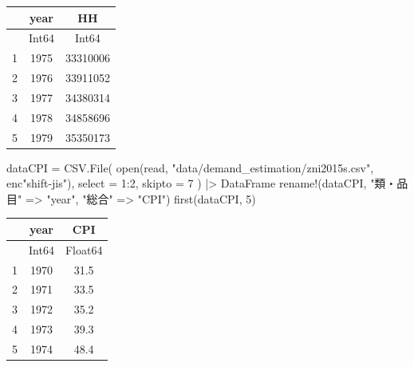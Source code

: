 \documentclass[
  letterpaper,
  DIV=11,
  numbers=noendperiod]{scrreprt}
\newenvironment{Shaded}{\begin{snugshade}}{\end{snugshade}}
\newcommand{\FloatTok}[1]{\textcolor[rgb]{0.68,0.00,0.00}{#1}}
\newcommand{\FunctionTok}[1]{\textcolor[rgb]{0.28,0.35,0.67}{#1}}
\newcommand{\NormalTok}[1]{\textcolor[rgb]{0.00,0.23,0.31}{#1}}
\newcommand{\OperatorTok}[1]{\textcolor[rgb]{0.37,0.37,0.37}{#1}}
\newcommand{\StringTok}[1]{\textcolor[rgb]{0.13,0.47,0.30}{#1}}
\begin{document}
\begin{tabular}{r|cc}
    & year & HH\\
    \hline
    & Int64 & Int64\\
    \hline
    1 & 1975 & 33310006 \\
    2 & 1976 & 33911052 \\
    3 & 1977 & 34380314 \\
    4 & 1978 & 34858696 \\
    5 & 1979 & 35350173 \\
\end{tabular}

\begin{Shaded}
\begin{Highlighting}[]
\NormalTok{dataCPI }\OperatorTok{=}\NormalTok{ CSV.}\FunctionTok{File}\NormalTok{(}
    \FunctionTok{open}\NormalTok{(read, }\StringTok{"data/demand\_estimation/zni2015s.csv"}\NormalTok{, enc}\StringTok{"shift{-}jis"}\NormalTok{), }
\NormalTok{    select }\OperatorTok{=} \FloatTok{1}\OperatorTok{:}\FloatTok{2}\NormalTok{,}
\NormalTok{    skipto }\OperatorTok{=} \FloatTok{7}
\NormalTok{    ) }\OperatorTok{|\textgreater{}}\NormalTok{ DataFrame}
\FunctionTok{rename!}\NormalTok{(dataCPI, }\StringTok{"類・品目"} \OperatorTok{=\textgreater{}} \StringTok{"year"}\NormalTok{, }\StringTok{"総合"} \OperatorTok{=\textgreater{}} \StringTok{"CPI"}\NormalTok{)}
\FunctionTok{first}\NormalTok{(dataCPI, }\FloatTok{5}\NormalTok{)}
\end{Highlighting}
\end{Shaded}

\begin{tabular}{r|cc}
    & year & CPI\\
    \hline
    & Int64 & Float64\\
    \hline
    1 & 1970 & 31.5 \\
    2 & 1971 & 33.5 \\
    3 & 1972 & 35.2 \\
    4 & 1973 & 39.3 \\
    5 & 1974 & 48.4 \\
\end{tabular}
\end{document}
